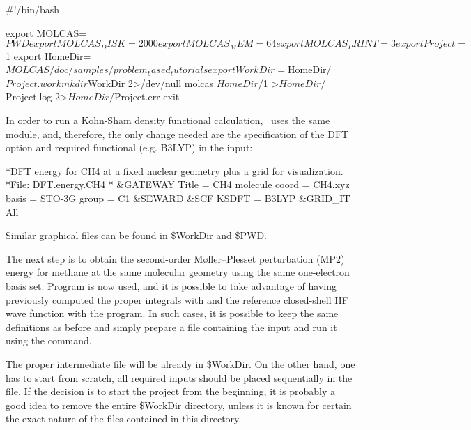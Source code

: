 \begin{inputlisting}
#!/bin/bash
                                                                                                                                                                            
export MOLCAS=$PWD
export MOLCAS_DISK=2000
export MOLCAS_MEM=64
export MOLCAS_PRINT=3
                                                                                                                                                                            
export Project=$1
export HomeDir=$MOLCAS/doc/samples/problem_based_tutorials
export WorkDir=$HomeDir/$Project.work
mkdir $WorkDir 2>/dev/null
molcas $HomeDir/$1 >$HomeDir/$Project.log 2>$HomeDir/$Project.err
exit
\end{inputlisting}

In order to run a Kohn-Sham density functional calculation, \molcas\ uses the 
same  module, and, therefore, the only change needed are the specification 
of the DFT option and required functional (e.g. B3LYP) in the  input:

\begin{inputlisting}
*DFT energy for CH4 at a fixed nuclear geometry plus a grid for visualization.
*File: DFT.energy.CH4
*
&GATEWAY
 Title = CH4 molecule
 coord = CH4.xyz 
 basis = STO-3G 
 group = C1
&SEWARD
&SCF 
 KSDFT = B3LYP
&GRID_IT 
 All
\end{inputlisting}

Similar graphical files can be found in \$WorkDir and \$PWD.

The next step is to obtain  the second-order M{\o}ller--Plesset perturbation (MP2)
energy for methane at the same molecular geometry using the same one-electron
basis set. Program  is now used, and it is possible to take 
advantage of having previously computed the proper integrals with 
and the reference closed-shell HF wave function with the  program.
In such cases, it is possible to keep the same definitions as before and simply prepare a file 
containing the  input and run it using the 
command.

The proper intermediate file will be already in \$WorkDir.
On the other hand, one has to start from scratch, all required inputs should
be placed sequentially in the  file.
If the decision is to start the project from the beginning,  it is probably a good idea to remove
the entire {\$WorkDir} directory, unless it is known for certain the exact nature of the files contained in this directory.


